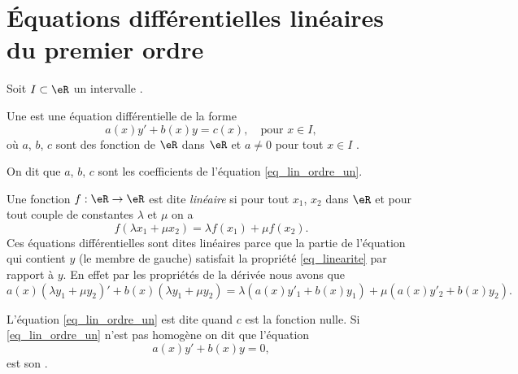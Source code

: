 \section{Équations différentielles linéaires du premier ordre}

\begin{definition}
Soit $I\subset\eR$ un intervalle .

Une   est une équation différentielle de la forme 
\begin{equation}\label{eq_lin_ordre_un}
  a(x)y' + b(x) y = c(x), \quad\text{pour } x\in I, 
\end{equation}
o\`u $a$, $b$, $c$ sont des fonction de $\eR$ dans $\eR$ et $a\neq 0$ pour tout $x\in I$ . 

On dit que $a$, $b$, $c$ sont les coefficients de l'équation \eqref{eq_lin_ordre_un}.
\end{definition}
\begin{remark}\label{remarque_lineaire}
  Une fonction $f: \eR\to\eR$ est dite \emph{linéaire} si pour tout $x_1$, $x_2$ dans $\eR$ et pour tout couple de constantes $\lambda$ et $\mu$ on a 
  \begin{equation}\label{eq_linearite}
    f(\lambda x_1 + \mu x_2) = \lambda f(x_1) +\mu f (x_2).
  \end{equation}
Ces équations différentielles sont dites linéaires parce que la partie de l'équation qui contient $y$ (le membre de gauche) satisfait la propriété \eqref{eq_linearite} par rapport à $y$. En effet par les propriétés de la dérivée nous avons que 
\[
 a(x)(\lambda y_1 + \mu y_2 )' + b(x) (\lambda y_1 + \mu y_2 ) =\lambda ( a(x)y'_1 + b(x) y_1 ) + \mu( a(x)y'_2 + b(x) y_2 ).
\]
\end{remark}
\begin{definition}
  L'équation \eqref{eq_lin_ordre_un} est dite  quand $c$ est la fonction nulle. 
Si \eqref{eq_lin_ordre_un} n'est pas homogène on dit que l'équation 
\begin{equation}\label{eq_lin_ordre_un_hom}
  a(x)y' + b(x) y =0,
\end{equation}
est son .
\end{definition}
